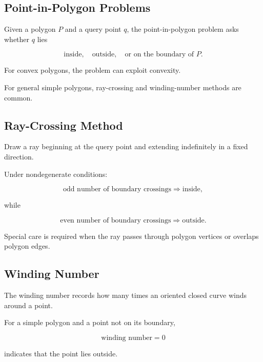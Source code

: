 \subsection{Point-in-Polygon Problems}
\label{subsec:point-in-polygon}

Given a polygon \(P\) and a query point \(q\), the point-in-polygon problem
asks whether \(q\) lies

\[
\boxed{
\text{inside},
\quad
\text{outside},
\quad
\text{or on the boundary of }P.
}
\]

For convex polygons, the problem can exploit convexity.

For general simple polygons, ray-crossing and winding-number methods are
common.

\subsection{Ray-Crossing Method}
\label{subsec:ray-crossing}

Draw a ray beginning at the query point and extending indefinitely in a
fixed direction.

Under nondegenerate conditions:

\[
\boxed{
\text{odd number of boundary crossings}
\Longrightarrow
\text{inside},
}
\]

while

\[
\boxed{
\text{even number of boundary crossings}
\Longrightarrow
\text{outside}.
}
\]

Special care is required when the ray passes through polygon vertices or
overlaps polygon edges.

\subsection{Winding Number}
\label{subsec:winding-number-computational}

The winding number records how many times an oriented closed curve winds
around a point.

For a simple polygon and a point not on its boundary,

\[
\boxed{
\text{winding number}=0
}
\]

indicates that the point lies outside.


